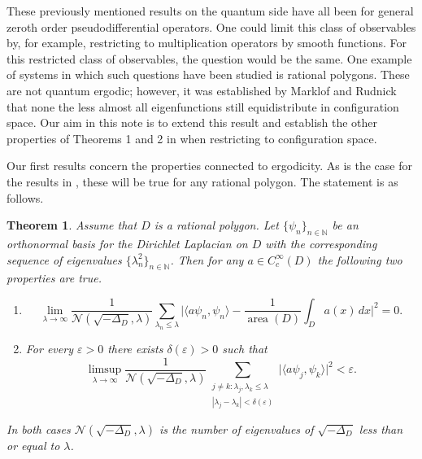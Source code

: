 \documentclass[11pt,twoside,reqno]{amsart}
\newcommand{\N}{\mathbb{N}}
\newcommand{\1}{\mathrm{\mathbf{1}}}
\DeclareMathOperator{\area}{area}
\numberwithin{equation}{section}
\theoremstyle{plain}
\newtheorem{theorem}[thm]{Theorem}
\theoremstyle{definition}
\theoremstyle{remark}
\begin{document}
These previously mentioned results on the quantum side have all been for general zeroth order pseudodifferential operators. One could limit this class of observables by, for example, restricting to multiplication operators by smooth functions. For this restricted class of observables, the question would be the same. One example of systems in which such questions have been studied is rational polygons. These are not quantum ergodic; however, it was established by Marklof and Rudnick \cite{MR2879311} that none the less almost all eigenfunctions still equidistribute in configuration space. Our aim in this note is to extend this result and establish the other properties of Theorems 1 and 2 in \cite{Zel05} when restricting to configuration space.         

Our first results concern the properties connected to ergodicity. As is the case for the results in \cite{MR2879311}, these will be true for any rational polygon. The statement is as follows.


\begin{theorem}\label{thm:main_1}
    Assume that $D$ is a rational polygon. Let $\{\psi_n\}_{n\in\N}$ be an orthonormal basis for the Dirichlet Laplacian on $D$ with the corresponding sequence of eigenvalues $\{\lambda_n^2\}_{n\in\N}$. Then for any $a\in C^\infty_c(D)$ the following two properties are true.  
    \begin{enumerate}[label=$(\arabic*)$]
        \item
        \begin{equation*}
        \lim_{\lambda\rightarrow \infty}\frac{1}{\mathcal{N}(\sqrt{-\Delta_D},\lambda)} \sum_{\lambda_n \leq \lambda} \Big| \langle a \psi_n , \psi_n\rangle - \frac{1}{\area(D)} \int_{D} a(x)  \, dx \Big|^2 =0.
        \end{equation*}
        \item For every $\varepsilon>0$ there exists $\delta(\varepsilon)>0$ such that
        \begin{equation*}
        \limsup_{\lambda\rightarrow \infty}\frac{1}{\mathcal{N}(\sqrt{-\Delta_D},\lambda)} \sum_{\substack{j\neq k: \lambda_j,\lambda_k\leq \lambda  \\ |\lambda_{j}-\lambda_{k}| < \delta(\varepsilon)}} \big| \langle a \psi_j , \psi_k\rangle  \big|^2 <\varepsilon.
        \end{equation*}
    \end{enumerate}
    In both cases $\mathcal{N}(\sqrt{-\Delta_D},\lambda)$ is the number of eigenvalues of $\sqrt{-\Delta_D}$ less than or equal to $\lambda$. 
\end{theorem}
\end{document}
